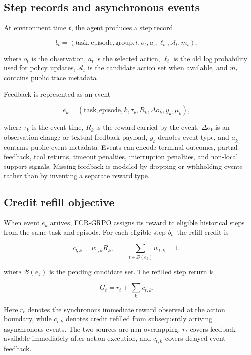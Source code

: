 \documentclass[letterpaper]{article} %
\begin{document}
\subsection{Step records and asynchronous events}

At environment time \(t\), the agent produces a step record

\[
b_t = (\text{task}, \text{episode}, \text{group}, t, o_t, a_t, \ell_t, \mathcal{A}_t, m_t),
\]

where \(o_t\) is the observation, \(a_t\) is the selected action, \(\ell_t\) is the old log probability used for policy updates, \(\mathcal{A}_t\) is the candidate action set when available, and \(m_t\) contains public trace metadata.

Feedback is represented as an event

\[
e_k = (\text{task}, \text{episode}, k, \tau_k, R_k, \Delta o_k, y_k, \mu_k),
\]

where \(\tau_k\) is the event time, \(R_k\) is the reward carried by the event, \(\Delta o_k\) is an observation change or textual feedback payload, \(y_k\) denotes event type, and \(\mu_k\) contains public event metadata. Events can encode terminal outcomes, partial feedback, tool returns, timeout penalties, interruption penalties, and non-local support signals. Missing feedback is modeled by dropping or withholding events rather than by inventing a separate reward type.

\subsection{Credit refill objective}

When event \(e_k\) arrives, ECR-GRPO assigns its reward to eligible historical steps from the same task and episode. For each eligible step \(b_t\), the refill credit is

\[
c_{t,k}=w_{t,k}R_k,\qquad \sum_{t\in \mathcal{B}(e_k)} w_{t,k}=1,
\]

where \(\mathcal{B}(e_k)\) is the pending candidate set. The refilled step return is

\[
G_t = r_t + \sum_k c_{t,k}.
\]

Here \(r_t\) denotes the synchronous immediate reward observed at the action boundary, while \(c_{t,k}\) denotes credit refilled from subsequently arriving asynchronous events. The two sources are non-overlapping: \(r_t\) covers feedback available immediately after action execution, and \(c_{t,k}\) covers delayed event feedback.
\end{document}

